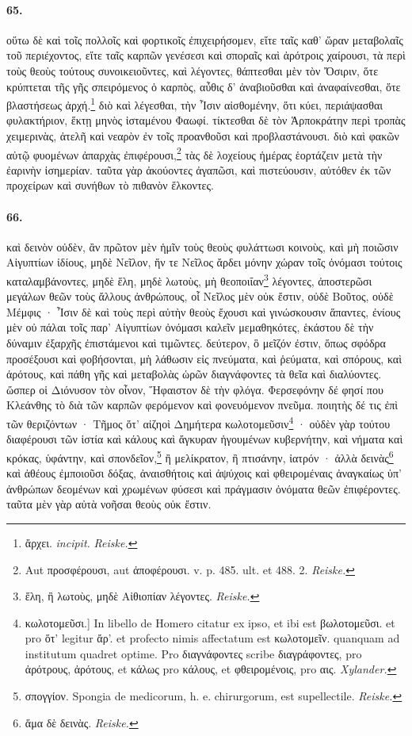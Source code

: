 \documentclass[a4paper, 11pt, oneside, polutonikogreek, german, landscape]{article}
\begin{document}
\paragraph{65.}
οὕτω δὲ καὶ τοῖς πολλοῖς καὶ φορτικοῖς ἐπιχειρήσομεν, εἴτε ταῖς καθ' ὥραν μεταβολαῖς τοῦ περιέχοντος, εἴτε ταῖς καρπῶν γενέσεσι καὶ σποραῖς καὶ ἀρότροις χαίρουσι, τὰ περὶ τοὺς θεοὺς τούτους συνοικειοῦντες, καὶ λέγοντες, θάπτεσθαι μὲν τὸν Ὄσιριν, ὅτε κρύπτεται τῆς γῆς σπειρόμενος ὁ καρπὸς, αὖθις δ' ἀναβιοῦσθαι καὶ ἀναφαίνεσθαι, ὅτε βλαστήσεως ἀρχή.\footnote{ἄρχει. \emph{incipit.} \emph{Reiske.}} διὸ καὶ λέγεσθαι, τὴν Ἶσιν αἰσθομένην, ὅτι κύει, περιάψασθαι φυλακτήριον, ἕκτῃ μηνὸς ἱσταμένου Φαωφί. τίκτεσθαι δὲ τὸν Ἁρποκράτην περὶ τροπὰς χειμερινὰς, ἀτελῆ καὶ νεαρὸν ἐν τοῖς προανθοῦσι καὶ προβλαστάνουσι. διὸ καὶ φακῶν αὐτῷ φυομένων ἀπαρχὰς ἐπιφέρουσι,\footnote{Aut προσφέρουσι, aut ἀποφέρουσι. v. p. 485. ult. et 488. 2. \emph{Reiske.}} τὰς δὲ λοχείους ἡμέρας ἑορτάζειν μετὰ τὴν ἐαρινὴν ἰσημερίαν. ταῦτα γὰρ ἀκούοντες ἀγαπῶσι, καὶ πιστεύουσιν, αὐτόθεν ἐκ τῶν προχείρων καὶ συνήθων τὸ πιθανὸν ἕλκοντες.

\paragraph{66.}
καὶ δεινὸν οὐδὲν, ἂν πρῶτον μὲν ἡμῖν τοὺς θεοὺς φυλάττωσι κοινοὺς, καὶ μὴ ποιῶσιν Αἰγυπτίων ἰδίους, μηδὲ Νεῖλον, ἥν τε Νεῖλος ἄρδει μόνην χώραν τοῖς ὀνόμασι τούτοις καταλαμβάνοντες, μηδὲ ἕλη, μηδὲ λωτοὺς, μὴ θεοποιΐαν\footnote{ἕλη, ἢ λωτοὺς, μηδὲ Αἰθιοπίαν λέγοντες. \emph{Reiske.}} λέγοντες, ἀποστερῶσι μεγάλων θεῶν τοὺς ἄλλους ἀνθρώπους, οἷ Νεῖλος μὲν οὐκ ἔστιν, οὐδὲ Βοῦτος, οὐδὲ Μέμφις · Ἶσιν δὲ καὶ τοὺς περὶ αὐτὴν θεοὺς ἔχουσι καὶ γινώσκουσιν ἅπαντες, ἐνίους μὲν οὐ πάλαι τοῖς παρ' Αἰγυπτίων ὀνόμασι καλεῖν μεμαθηκότες, ἑκάστου δὲ τὴν δύναμιν ἐξαρχῆς ἐπιστάμενοι καὶ τιμῶντες. δεύτερον, ὃ μεῖζόν ἐστιν, ὅπως σφόδρα προσέξουσι καὶ φοβήσονται, μὴ λάθωσιν εἰς πνεύματα, καὶ ῥεύματα, καὶ σπόρους, καὶ ἀρότους, καὶ πάθη γῆς καὶ μεταβολὰς ὡρῶν διαγνάφοντες τὰ θεῖα καὶ διαλύοντες. ὥσπερ οἱ Διόνυσον τὸν οἶνον, Ἥφαιστον δὲ τὴν φλόγα. Φερσεφόνην δέ φησί που Κλεάνθης τὸ διὰ τῶν καρπῶν φερόμενον καὶ φονευόμενον πνεῦμα. ποιητὴς δέ τις ἐπὶ τῶν θεριζόντων · Τῆμος ὅτ' αἰζηοὶ Δημήτερα κωλοτομεῦσιν\footnote{κωλοτομεῦσι.] In libello de Homero citatur ex ipso, et ibi est βωλοτομεῦσι. et pro ὅτ' legitur ἄρ'. et profecto nimis affectatum est κωλοτομεῖν. quanquam ad institutum quadret optime. Pro διαγνάφοντες scribe διαγράφοντες, pro ἀρότρους, ἀρότους, et κάλως pro κάλους, et φθειρομένοις, pro αις. \emph{Xylander.} } · οὐδὲν γὰρ τούτου διαφέρουσι τῶν ἱστία καὶ κάλους καὶ ἄγκυραν ἡγουμένων κυβερνήτην, καὶ νήματα καὶ κρόκας, ὑφάντην, καὶ σπονδεῖον,\footnote{σπογγίον. Spongia de medicorum, h. e. chirurgorum, est supellectile. \emph{Reiske.}} ἢ μελίκρατον, ἢ πτισάνην, ἰατρόν · ἀλλὰ δεινὰς\footnote{ἅμα δὲ δεινὰς. \emph{Reiske.}} καὶ ἀθέους ἐμποιοῦσι δόξας, ἀναισθήτοις καὶ ἀψύχοις καὶ φθειρομέναις ἀναγκαίως ὑπ' ἀνθρώπων δεομένων καὶ χρωμένων φύσεσι καὶ πράγμασιν ὀνόματα θεῶν ἐπιφέροντες. ταῦτα μὲν γὰρ αὐτὰ νοῆσαι θεοὺς οὐκ ἔστιν.
\end{document}
